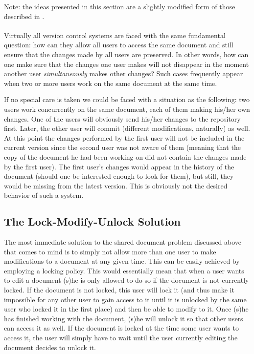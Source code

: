 Note: the ideas presented in this section are a slightly modified form of those described in
\cite{collins04}.
\\
\\
Virtually all version control systems are faced with the same fundamental question: how
can they allow all users to access the same document and still ensure that
the changes made by all users are preserved. In other words, how can one make
sure that the changes one user makes will not disappear in the moment another user
\emph{simultaneously} makes other changes? Such cases frequently appear when two
or more users work on the same document at the same time.

If no special care is taken we could be faced with a situation as the following: two
users work concurrently on the same document, each of them making his/her own changes.
One of the users will obviously send his/her changes to the repository first. Later,
the other user will commit (different modifications, naturally) as well. At this point
the changes performed by the first user will not be included in the current version since
the second user was not aware of them (meaning that the copy of the document he had
been working on did not contain the changes made by the first user). The first user's
changes would appear in the history of the document (should one be interested enough
to look for them), but still, they would be missing from the latest version. This is
obviously not the desired behavior of such a system.

\subsection{The Lock-Modify-Unlock Solution}

The most immediate solution to the shared document problem discussed above that comes to
mind is to simply not allow more than one user to make modifications to a document at
any given time. This can be easily achieved by employing a locking policy. This would
essentially mean that when a user wants to edit a document (s)he is only allowed to do
so if the document is not currently locked. If the document is not locked, this user
will lock it (and thus make it impossible for any other user to gain access to it until
it is unlocked by the same user who locked it in the first place) and then be able
to modify to it. Once (s)he has finished working with the document, (s)he will
unlock it so that other users can access it as well. If the document is locked at the
time some user wants to access it, the user will simply have to wait until the user
currently editing the document decides to unlock it.

